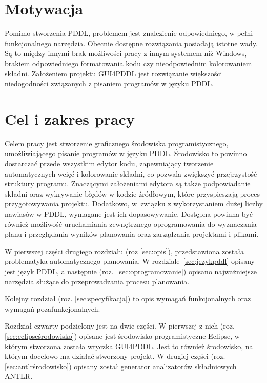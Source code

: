 \section{Motywacja}
Pomimo stworzenia PDDL, problemem jest znalezienie odpowiedniego, w pełni funkcjonalnego narzędzia. Obecnie dostępne rozwiązania posiadają istotne wady. Są to między innymi brak możliwości pracy z innym systemem  niż Windows, brakiem odpowiedniego formatowania kodu czy nieodpowiednim kolorowaniem składni. Założeniem projektu GUI4PDDL jest rozwiązanie większości niedogodności związanych z pisaniem programów w języku PDDL.

\section{Cel i zakres pracy}
Celem pracy jest stworzenie graficznego środowiska programistycznego, umożliwiającego pisanie programów w języku PDDL. Środowisko to powinno dostarczać przede wszystkim edytor kodu, zapewniający tworzenie automatycznych wcięć i kolorowanie składni, co pozwala zwiększyć przejrzystość struktury programu. Znaczącymi założeniami edytora są także podpowiadanie składni oraz wykrywanie błędów w kodzie źródłowym, które przyspieszają proces przygotowywania projektu. Dodatkowo, w~związku z wykorzystaniem dużej liczby nawiasów w PDDL, wymagane jest ich dopasowywanie. Dostępna powinna być również możliwość uruchamiania zewnętrznego oprogramowania do wyznaczania planu i przeglądania wyników planowania oraz zarządzania projektami i plikami.  

W pierwszej części drugiego rozdziału (roz \ref{sec:opis}), przedstawiona została problematyka automatycznego planowania. W rozdziale~\ref{sec:jezykpddl} opisany jest język PDDL, a następnie (roz.~\ref{sec:oprogramowanie}) opisano najważniejsze narzędzia służące do przeprowadzania procesu planowania.

Kolejny rozdział (roz. \ref{sec:specyfikacja}) to opis wymagań funkcjonalnych oraz wymagań pozafunkcjonalnych.

Rozdział czwarty podzielony jest na dwie części. W pierwszej z nich (roz. \ref{sec:eclipseśrodowisko})  opisane jest środowisko programistyczne Eclipse, w którym stworzona została wtyczka GUI4PDDL. Jest to również środowisko, na którym docelowo ma działać stworzony projekt. W drugiej części (roz. \ref{sec:antlrśrodowisko}) opisany został generator analizatorów składniowych ANTLR.

